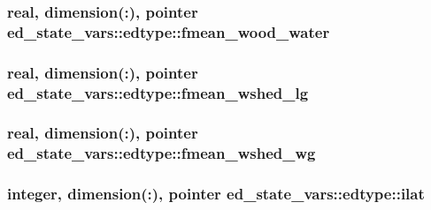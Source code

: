 \subsubsection[{\texorpdfstring{fmean\+\_\+wood\+\_\+water}{fmean_wood_water}}]{\setlength{\rightskip}{0pt plus 5cm}real, dimension(\+:), pointer ed\+\_\+state\+\_\+vars\+::edtype\+::fmean\+\_\+wood\+\_\+water}\hypertarget{structed__state__vars_1_1edtype_a4ab09fc27f68f2abcb81de6b4cda3137}{}\label{structed__state__vars_1_1edtype_a4ab09fc27f68f2abcb81de6b4cda3137}
\subsubsection[{\texorpdfstring{fmean\+\_\+wshed\+\_\+lg}{fmean_wshed_lg}}]{\setlength{\rightskip}{0pt plus 5cm}real, dimension(\+:), pointer ed\+\_\+state\+\_\+vars\+::edtype\+::fmean\+\_\+wshed\+\_\+lg}\hypertarget{structed__state__vars_1_1edtype_a948594db67b83503cf914a2ff51cb110}{}\label{structed__state__vars_1_1edtype_a948594db67b83503cf914a2ff51cb110}
\subsubsection[{\texorpdfstring{fmean\+\_\+wshed\+\_\+wg}{fmean_wshed_wg}}]{\setlength{\rightskip}{0pt plus 5cm}real, dimension(\+:), pointer ed\+\_\+state\+\_\+vars\+::edtype\+::fmean\+\_\+wshed\+\_\+wg}\hypertarget{structed__state__vars_1_1edtype_ab1785afb896816409918217141cea532}{}\label{structed__state__vars_1_1edtype_ab1785afb896816409918217141cea532}
\subsubsection[{\texorpdfstring{ilat}{ilat}}]{\setlength{\rightskip}{0pt plus 5cm}integer, dimension(\+:), pointer ed\+\_\+state\+\_\+vars\+::edtype\+::ilat}\hypertarget{structed__state__vars_1_1edtype_a2bcc7bde535419e42bbd3d8a6d0e37e3}{}\label{structed__state__vars_1_1edtype_a2bcc7bde535419e42bbd3d8a6d0e37e3}
